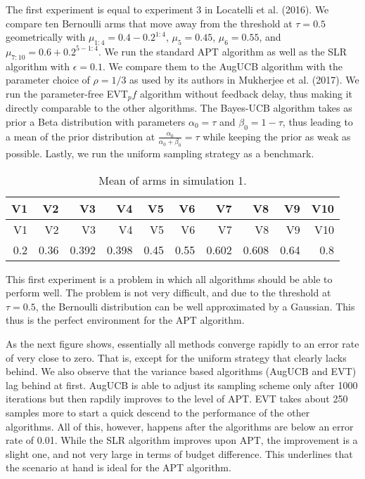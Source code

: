 \documentclass[11pt,]{article}
\begin{document}
The first experiment is equal to experiment 3 in Locatelli et al.
(2016). We compare ten Bernoulli arms that move away from the threshold
at \(\tau = 0.5\) geometrically with \(\mu_{1:4} = 0.4-0.2^{1:4}\),
\(\mu_5 = 0.45\), \(\mu_6 = 0.55\), and
\(\mu_{7:10} = 0.6 + 0.2^{5-1:4}\). We run the standard APT algorithm as
well as the SLR algorithm with \(\epsilon = 0.1\). We compare them to
the AugUCB algorithm with the parameter choice of \(\rho = 1/3\) as used
by its authors in Mukherjee et al. (2017). We run the parameter-free
EVT\(_pf\) algorithm without feedback delay, thus making it directly
comparable to the other algorithms. The Bayes-UCB algorithm takes as
prior a Beta distribution with parameters \(\alpha_0 = \tau\) and
\(\beta_0 = 1 - \tau\), thus leading to a mean of the prior distribution
at \(\frac{\alpha_0}{\alpha_0+\beta_0}=\tau\) while keeping the prior as
weak as possible. Lastly, we run the uniform sampling strategy as a
benchmark.

\begin{longtable}[]{@{}rrrrrrrrrr@{}}
\caption{Mean of arms in simulation 1.}\tabularnewline
\toprule
V1 & V2 & V3 & V4 & V5 & V6 & V7 & V8 & V9 & V10\tabularnewline
\midrule
\endfirsthead
\toprule
V1 & V2 & V3 & V4 & V5 & V6 & V7 & V8 & V9 & V10\tabularnewline
\midrule
\endhead
0.2 & 0.36 & 0.392 & 0.398 & 0.45 & 0.55 & 0.602 & 0.608 & 0.64 &
0.8\tabularnewline
\bottomrule
\end{longtable}

This first experiment is a problem in which all algorithms should be
able to perform well. The problem is not very difficult, and due to the
threshold at \(\tau = 0.5\), the Bernoulli distribution can be well
approximated by a Gaussian. This thus is the perfect environment for the
APT algorithm.

As the next figure shows, essentially all methods converge rapidly to an
error rate of very close to zero. That is, except for the uniform
strategy that clearly lacks behind. We also observe that the variance
based algorithms (AugUCB and EVT) lag behind at first. AugUCB is able to
adjust its sampling scheme only after 1000 iterations but then rapdily
improves to the level of APT. EVT takes about 250 samples more to start
a quick descend to the performance of the other algorithms. All of this,
however, happens after the algorithms are below an error rate of 0.01.
While the SLR algorithm improves upon APT, the improvement is a slight
one, and not very large in terms of budget difference. This underlines
that the scenario at hand is ideal for the APT algorithm.
\end{document}
